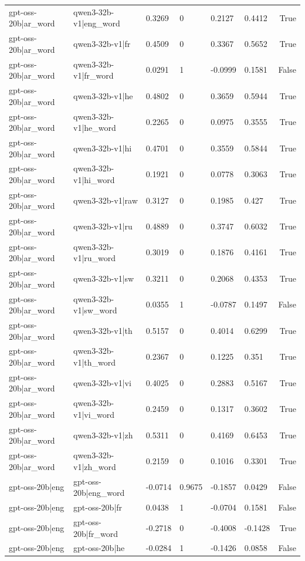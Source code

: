 \begin{table}
\begin{tabular}{llllllr}
gpt-oss-20b|ar_word & qwen3-32b-v1|eng_word & 0.3269 & 0 & 0.2127 & 0.4412 & True \\
gpt-oss-20b|ar_word & qwen3-32b-v1|fr & 0.4509 & 0 & 0.3367 & 0.5652 & True \\
gpt-oss-20b|ar_word & qwen3-32b-v1|fr_word & 0.0291 & 1 & -0.0999 & 0.1581 & False \\
gpt-oss-20b|ar_word & qwen3-32b-v1|he & 0.4802 & 0 & 0.3659 & 0.5944 & True \\
gpt-oss-20b|ar_word & qwen3-32b-v1|he_word & 0.2265 & 0 & 0.0975 & 0.3555 & True \\
gpt-oss-20b|ar_word & qwen3-32b-v1|hi & 0.4701 & 0 & 0.3559 & 0.5844 & True \\
gpt-oss-20b|ar_word & qwen3-32b-v1|hi_word & 0.1921 & 0 & 0.0778 & 0.3063 & True \\
gpt-oss-20b|ar_word & qwen3-32b-v1|raw & 0.3127 & 0 & 0.1985 & 0.427 & True \\
gpt-oss-20b|ar_word & qwen3-32b-v1|ru & 0.4889 & 0 & 0.3747 & 0.6032 & True \\
gpt-oss-20b|ar_word & qwen3-32b-v1|ru_word & 0.3019 & 0 & 0.1876 & 0.4161 & True \\
gpt-oss-20b|ar_word & qwen3-32b-v1|sw & 0.3211 & 0 & 0.2068 & 0.4353 & True \\
gpt-oss-20b|ar_word & qwen3-32b-v1|sw_word & 0.0355 & 1 & -0.0787 & 0.1497 & False \\
gpt-oss-20b|ar_word & qwen3-32b-v1|th & 0.5157 & 0 & 0.4014 & 0.6299 & True \\
gpt-oss-20b|ar_word & qwen3-32b-v1|th_word & 0.2367 & 0 & 0.1225 & 0.351 & True \\
gpt-oss-20b|ar_word & qwen3-32b-v1|vi & 0.4025 & 0 & 0.2883 & 0.5167 & True \\
gpt-oss-20b|ar_word & qwen3-32b-v1|vi_word & 0.2459 & 0 & 0.1317 & 0.3602 & True \\
gpt-oss-20b|ar_word & qwen3-32b-v1|zh & 0.5311 & 0 & 0.4169 & 0.6453 & True \\
gpt-oss-20b|ar_word & qwen3-32b-v1|zh_word & 0.2159 & 0 & 0.1016 & 0.3301 & True \\
gpt-oss-20b|eng & gpt-oss-20b|eng_word & -0.0714 & 0.9675 & -0.1857 & 0.0429 & False \\
gpt-oss-20b|eng & gpt-oss-20b|fr & 0.0438 & 1 & -0.0704 & 0.1581 & False \\
gpt-oss-20b|eng & gpt-oss-20b|fr_word & -0.2718 & 0 & -0.4008 & -0.1428 & True \\
gpt-oss-20b|eng & gpt-oss-20b|he & -0.0284 & 1 & -0.1426 & 0.0858 & False \\

\end{tabular}
\end{table}
